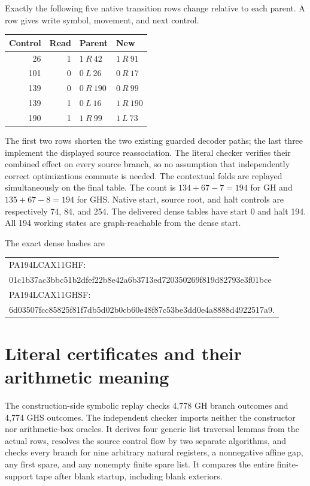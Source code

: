 \documentclass[11pt]{article}
\begin{document}
Exactly the following five native transition rows change relative to
each parent. A row gives write symbol, movement, and next control.
\begin{center}
\begin{tabular}{rrll}
\toprule
Control & Read & Parent & New \\
\midrule
26 & 1 & $1\ R\ 42$ & $1\ R\ 91$ \\
101 & 0 & $0\ L\ 26$ & $0\ R\ 17$ \\
139 & 0 & $0\ R\ 190$ & $0\ R\ 99$ \\
139 & 1 & $0\ L\ 16$ & $1\ R\ 190$ \\
190 & 1 & $1\ R\ 99$ & $1\ L\ 73$ \\
\bottomrule
\end{tabular}
\end{center}
The first two rows shorten the two existing guarded decoder paths; the
last three implement the displayed source reassociation. The literal
checker verifies their combined effect on every source branch, so no
assumption that independently correct optimizations commute is needed.
The contextual folds are replayed simultaneously on the final table.
The count is $134+67-7=194$ for GH and $135+67-8=194$ for GHS.
Native start, source root, and halt controls are respectively 74, 84,
and 254. The delivered dense tables have start 0 and halt 194.
All 194 working states are graph-reachable from the dense start.

The exact dense hashes are
\begin{center}\small\ttfamily
\begin{tabular}{l}
PA194LCAX11GHF:\\
01c1b37ac3bbc51b2dfef22b8e42a6b3713ed720350269f819d82793e3f01bce\\[3pt]
PA194LCAX11GHSF:\\
6d03507fcc85825f81f7db5d02b0cb60e48f87c53be3dd0e4a8888d4922517a9.
\end{tabular}
\end{center}

\section{Literal certificates and their arithmetic meaning}
The construction-side symbolic replay checks 4,778 GH branch outcomes
and 4,774 GHS outcomes. The independent checker imports neither the
constructor nor arithmetic-box oracles. It derives four generic list
traversal lemmas from the actual rows, resolves the source control flow
by two separate algorithms, and checks every branch for nine arbitrary
natural registers, a nonnegative affine gap, any first spare, and any
nonempty finite spare list. It compares the entire finite-support tape
after blank startup, including blank exteriors.
\end{document}
